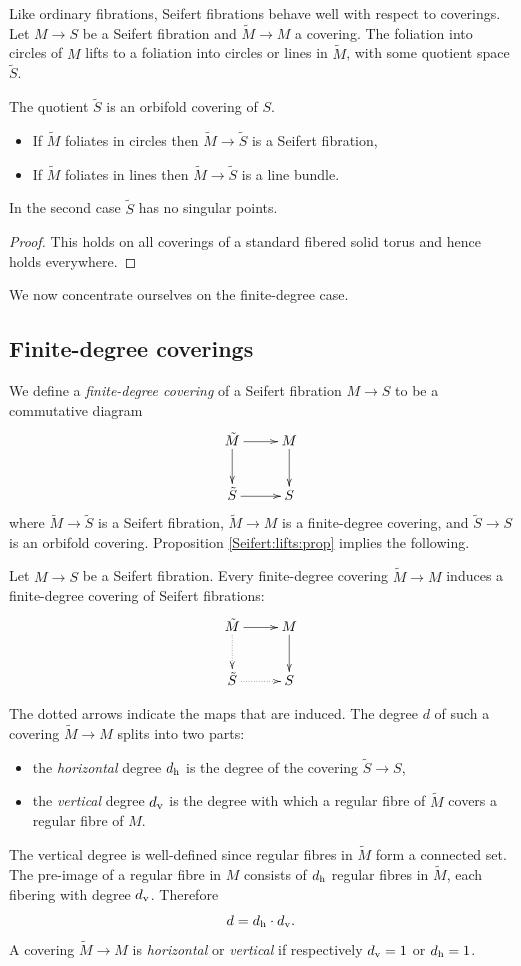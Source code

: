 Like ordinary fibrations, Seifert fibrations behave well with respect to coverings.
Let $M \to S$ be a Seifert fibration and $\tilde M \to M$ a covering. The foliation into circles of $M$ lifts to a foliation into circles or lines in $\tilde M$, with some quotient space $\tilde S$. 

\begin{prop} \label{Seifert:lifts:prop}
The quotient $\tilde S$ is an orbifold covering of $S$. 
\begin{itemize}
\item If $\tilde M$ foliates in circles then $\tilde M \to \tilde S$ is a Seifert fibration, 
\item If $\tilde M$ foliates in lines then $\tilde M \to \tilde S$ is a line bundle.
\end{itemize}
In the second case $\tilde S$ has no singular points.
\end{prop}
\begin{proof}
This holds on all coverings of a standard fibered solid torus and hence holds everywhere.
\end{proof}

We now concentrate ourselves on the finite-degree case.

\subsection{Finite-degree coverings}
We define a \emph{finite-degree covering} of a Seifert fibration $M\to S$ to be a commutative diagram
$$
\xymatrix{ 
\tilde M\ar[r] \ar[d] & M \ar[d] \\
\tilde S\ar[r] & S
}
$$
where $\tilde M \to \tilde S$ is a Seifert fibration, $\tilde M \to M$ is a finite-degree covering, and $\tilde S \to S$ is an orbifold covering. Proposition \ref{Seifert:lifts:prop} implies the following.

\begin{cor}
Let $M\to S$ be a Seifert fibration. Every finite-degree covering $\tilde M \to M$ induces a finite-degree covering of Seifert fibrations:
$$
\xymatrix{ 
\tilde M\ar[r] \ar@{.>}[d] & M \ar[d] \\
\tilde S\ar@{.>}[r] & S
}
$$
\end{cor}
The dotted arrows indicate the maps that are induced. The degree $d$ of such a covering $\tilde M \to M$ splits into two parts: 
\begin{itemize}
\item the \emph{horizontal} degree $d_{\rm h}$ is the degree of the covering $\tilde S \to S$, 
\item the \emph{vertical} degree $d_{\rm v}$ is the degree with which a regular fibre of $\tilde M$ covers a regular fibre of $M$. 
\end{itemize}
The vertical degree is well-defined since regular fibres in $\tilde M$ form a connected set. The pre-image of a regular fibre in $M$ consists of $d_{\rm h}$ regular fibres in $\tilde M$, each fibering with degree $d_{\rm v}$. Therefore
$$d = d_{\rm h} \cdot d_{\rm v}.$$
A covering $\tilde M \to M$ is \emph{horizontal} or \emph{vertical} if respectively
$d_{\rm v} = 1$ or $d_{\rm h} = 1$.


